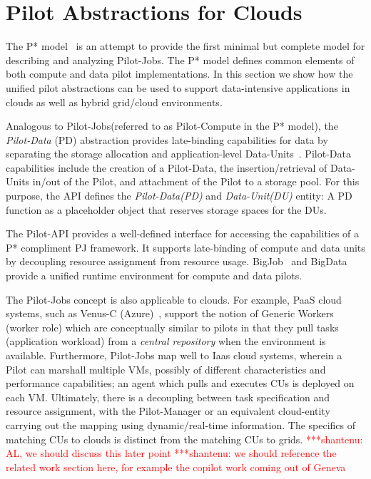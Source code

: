 \documentclass[times]{cpeauth}
\newcommand{\jhanote}[1]{ {\textcolor{red} { ***shantenu: #1 }}}
\newcommand{\jhanote}[1]{}
\newcommand{\pilot}{Pilot\xspace}
\newcommand{\pilotjobs}{Pilot-Jobs\xspace}
\newcommand{\pilotcompute}{Pilot-Compute\xspace}
\newcommand{\pilotdata}{Pilot-Data\xspace}
\newcommand{\pd}{PD\xspace}
\newcommand{\dataunit}{Data-Unit\xspace}
\newcommand{\dataunits}{Data-Units\xspace}
\newcommand{\dus}{DUs\xspace}
\newcommand{\cus}{CUs\xspace}
\begin{document}
\section{Pilot Abstractions for Clouds}

The P* model~\cite{pstar12} is an attempt to provide the first minimal but
complete model for describing and analyzing \pilotjobs. The P* model defines
common elements of both compute and data pilot implementations. In this 
section we show how the unified pilot abstractions can be used to support 
data-intensive applications in clouds as well as hybrid grid/cloud 
environments.

Analogous to \pilotjobs (referred to as \pilotcompute in the P* model), the
{\it Pilot-Data} (PD) abstraction provides late-binding capabilities for data
by separating the storage allocation and application-level
\dataunits~\cite{pstar12}. \pilotdata capabilities include the creation of a 
\pilotdata, the insertion/retrieval of Data-Units in/out of the \pilot, and 
attachment of the \pilot to a storage pool. For this purpose, the API defines 
the {\it \pilotdata (PD)} and {\it \dataunit (DU)} entity: A \pd function as a
placeholder object that reserves storage spaces for the \dus. 

The \pilot-API provides a well-defined interface for accessing the
capabilities of a P* compliment PJ framework. It supports late-binding of
compute and data units by decoupling resource assignment from resource usage.
BigJob~\cite{saga_bigjob_condor_cloud} and 
BigData~\cite{Mantha:2012:PEF:2287016.2287020} provide a unified runtime 
environment for compute and data pilots.

The \pilotjobs concept is also applicable to clouds. For example, PaaS
cloud systems, such as Venus-C (Azure)~\cite{venusc-generic-worker},
support the notion of Generic Workers (worker role) which are
conceptually similar to pilots in that they pull tasks (application
workload) from a {\it central repository} when the environment is
available. Furthermore, \pilotjobs map well to Iaas cloud systems,
wherein a \pilot can marshall multiple VMs, possibly of different
characteristics and performance capabilities; an agent which pulls and
executes \cus is deployed on each VM. Ultimately, there is a
decoupling between task specification and resource assignment, with
the \pilot-Manager or an equivalent cloud-entity carrying out the
mapping using dynamic/real-time information. The specifics of matching
\cus to clouds is distinct from the matching \cus to
grids.\jhanote{AL, we should discuss this later point} \jhanote{we
  should reference the related work section here, for example the
  copilot work coming out of Geneva}
\end{document}
